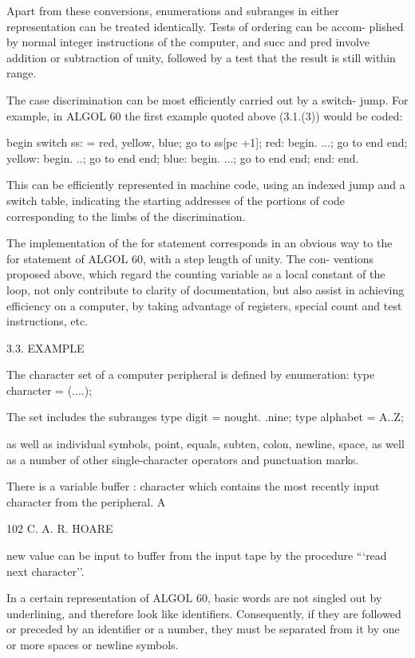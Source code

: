 Apart from these conversions, enumerations and subranges in either representation can be treated identically. Tests of ordering can be accom- plished by normal integer instructions of the computer, and succ and pred involve addition or subtraction of unity, followed by a test that the result is still within range.

The case discrimination can be most efficiently carried out by a switch- jump. For example, in ALGOL 60 the first example quoted above (3.1.(3)) would be coded:

begin switch ss: = red, yellow, blue; go to ss[pc +1]; red: begin. ...; go to end end; yellow: begin. ..; go to end end; blue: begin. ...; go to end end; end: end.

This can be efficiently represented in machine code, using an indexed jump and a switch table, indicating the starting addresses of the portions of code corresponding to the limbs of the discrimination.

The implementation of the for statement corresponds in an obvious way to the for statement of ALGOL 60, with a step length of unity. The con- ventions proposed above, which regard the counting variable as a local constant of the loop, not only contribute to clarity of documentation, but also assist in achieving efficiency on a computer, by taking advantage of registers, special count and test instructions, etc.

3.3. EXAMPLE

The character set of a computer peripheral is defined by enumeration: type character = (....);

The set includes the subranges type digit = nought. .nine; type alphabet = A..Z;

as well as individual symbols, point, equals, subten, colon, newline, space, as well as a number of other single-character operators and punctuation marks.

There is a variable buffer : character which contains the most recently input character from the peripheral. A

102 C. A. R. HOARE

new value can be input to buffer from the input tape by the procedure “‘read next character’’.

In a certain representation of ALGOL 60, basic words are not singled out by underlining, and therefore look like identifiers. Consequently, if they are followed or preceded by an identifier or a number, they must be separated from it by one or more spaces or newline symbols.


